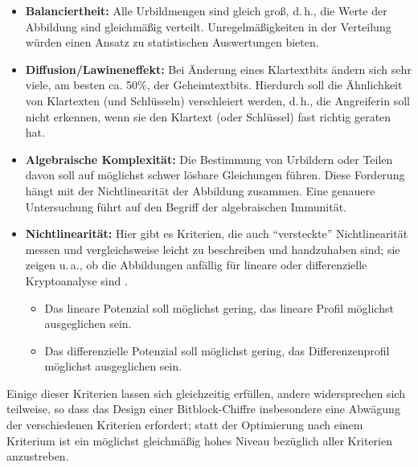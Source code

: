 \begin{refsegment}
\begin{itemize}
\item {\bf Balanciertheit:} Alle Urbildmengen
    sind gleich groß, d.\,h., die Werte
    der Abbildung sind gleichmäßig verteilt. Unregelmäßigkeiten in der Verteilung
    würden einen Ansatz zu statistischen Auswertungen bieten.
\item {\bf Diffusion/Lawineneffekt:}
    Bei Änderung eines Klartextbits ändern sich sehr viele, am besten
    ca. 50\%, der Geheimtextbits. Hierdurch soll die Ähnlichkeit von Klartexten
    (und Schlüsseln) verschleiert werden, d.\,h., die Angreiferin soll nicht
    erkennen, wenn sie den Klartext (oder Schlüssel) fast richtig geraten hat.
\item {\bf Algebraische Komplexität:} Die Bestimmung von Urbildern oder Teilen
    davon soll auf möglichst schwer lösbare Gleichungen führen. Diese Forderung
    hängt mit der Nichtlinearität der Abbildung zusammen.
    Eine genauere Untersuchung führt auf den Begriff der algebraischen
    Immunität.
\item {\bf Nichtlinearität:} Hier gibt es Kriterien, die auch "`versteckte"'
    Nichtlinearität messen und vergleichsweise leicht
    zu beschreiben und handzuhaben
    sind; sie zeigen u.\,a., ob die Abbildungen anfällig für
    lineare
    oder differenzielle
    Kryptoanalyse sind \cite{Pomm2008}.
    \begin{itemize}
    \item Das lineare Potenzial
        soll möglichst gering, das
        lineare Profil möglichst
        ausgeglichen sein.
    \item Das differenzielle
        Potenzial
        soll möglichst gering, das
        Differenzenprofil möglichst ausgeglichen sein.
    \end{itemize}
\end{itemize}
Einige dieser Kriterien lassen sich gleichzeitig erfüllen, andere
widersprechen sich teilweise, so dass das Design einer
Bitblock-Chiffre
insbesondere eine Abwägung der verschiedenen Kriterien erfordert;
statt der Optimierung nach einem Kriterium ist ein möglichst
gleichmäßig hohes Niveau bezüglich aller Kriterien anzustreben.


\end{refsegment}
